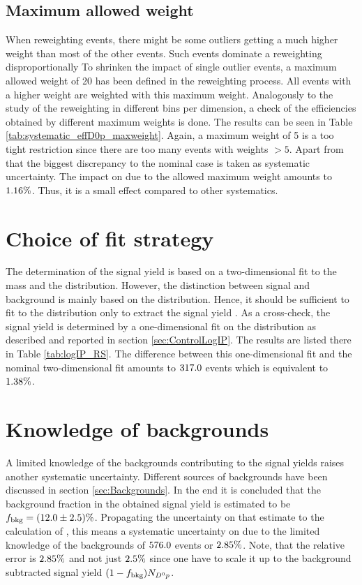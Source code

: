 \subsection{Maximum allowed weight}
When reweighting events, there might be some outliers getting a much higher weight than most of the other events.
Such events dominate a reweighting disproportionally
To shrinken the impact of single outlier events, a maximum allowed weight of 20 has been defined in the reweighting process.
All events with a higher weight are weighted with this maximum weight.
Analogously to the study of the reweighting in different bins per dimension, a check of the efficiencies obtained by different maximum weights is done.
The results can be seen in Table \ref{tab:systematic_effD0p_maxweight}.
Again, a maximum weight of 5 is a too tight restriction since there are too many events with weights $> 5$.
Apart from that the biggest discrepancy to the nominal case is taken as systematic uncertainty.
The impact on \R due to the allowed maximum weight amounts to $1.16\%$.
Thus, it is a small effect compared to other systematics.


\section{Choice of fit strategy}
The determination of the \LbToDpmunuX signal yield is based on a two-dimensional fit to the \Dz\proton mass and the \logIP distribution.
However, the distinction between signal and background is mainly based on the \logIP distribution.
Hence, it should be sufficient to fit to the \logIP distribution only to extract the signal yield \NDp.
As a cross-check, the signal yield \NDp is determined by a one-dimensional fit on the \logIP distribution as described and reported in section \ref{sec:ControlLogIP}.
The results are listed there in Table \ref{tab:logIP_RS}.
The difference between this one-dimensional fit and the nominal two-dimensional fit amounts to $317.0$ events which is equivalent to $1.38\%$.

\section{Knowledge of backgrounds}
A limited knowledge of the backgrounds contributing to the signal yields raises another systematic uncertainty.
Different sources of backgrounds have been discussed in section \ref{sec:Backgrounds}.
In the end it is concluded that the background fraction in the obtained signal yield \NDp is estimated to be $f_\text{bkg} = (12.0 \pm 2.5)\%$.
Propagating the uncertainty on that estimate to the calculation of \R, this means a systematic uncertainty on \NDp due to the limited knowledge of the backgrounds of $576.0$ events or $2.85\%$.
Note, that the relative error is $2.85\%$ and not just $2.5\%$ since one have to scale it up to the background subtracted signal yield $(1-f_\text{bkg})N_{{{D}^0}{p}}$.

